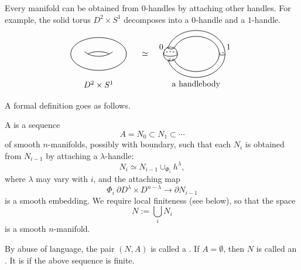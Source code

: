 Every manifold can be obtained from $0$-handles
by attaching other handles.
For example, the solid torus $D^2 \times S^1$
decomposes into a $0$-handle and a $1$-handle.
\[ \begin{tikzpicture}[line width=.6]
    \tikzstyle{dp}=[dash pattern=on 2pt off 2pt]
    \draw (0,0) ellipse (1.2 and .7);
    \draw (0,-.1) arc (-90 : -30 : .7 and .4);
    \draw (0,-.1) arc (-90 : -150 : .7 and .4);
    \draw (0,.1) arc (90 : 50 : .7 and .4);
    \draw (0,.1) arc (90 : 130 : .7 and .4);
    
    \node at (2,0) {\text{$\simeq$}};

    \draw[dp] (2.8,0) arc (180 : 50 : .3);
    \draw (2.8,0) arc (180 : 110 : .3);
    \draw (2.8,0) arc (180 : 420 : .3);
    \draw[dp] (2.8,0) arc (180 : 0 : .3 and .1);
    \draw (2.8,0) arc (180 : 360 : .3 and .1);

    \draw (5.45,0) arc (0 : 166 : 1.25 and 1);
    \draw (5.45,0) arc (0 : -165 : 1.25 and 1);
    \draw (5.2,0) arc (0 : 162 : 1 and .75);
    \draw (5.2,0) arc (0 : -161 : 1 and .75);

    \draw[dp] (3,.24) arc (180 : 0 : .12 and .03);
    \draw (3,.24) arc (180 : 360 : .12 and .03);
    \draw[dp] (3.12,-.24) ellipse (.12 and .03);
    \draw[dp] (5.2,0) arc (180 : 0 : .125 and .05);
    \draw (5.2,0) arc (180 : 360 : .125 and .05);

    \node at (0,-1.3) {\text{$D^2 \times S^1$}};
    \node at (4.2,-1.3) {\text{a handlebody}};
    \node at (2.7,.3) {\text{0}};
    \node at (5.6,.3) {\text{1}};
\end{tikzpicture} \]

A formal definition goes as follows.

\begin{definition}
    A  is a sequence
    \[ A = N_0 \subset N_1 \subset \cdots \]
    of smooth $n$-manifolds, possibly with boundary,
    such that each $N_i$ is obtained from $N_{i-1}$
    by attaching a $\lambda$-handle:
    \[ N_i \simeq N_{i-1} \cup_{\Phi_i} h^\lambda, \]
    where $\lambda$ may vary with $i$, and the attaching map
    \[ \Phi_i \: \partial D^\lambda \times D^{n-\lambda} \to \partial N_{i-1} \]
    is a smooth embedding.
    We require local finiteness (see below), so that the space
    \[ N := \bigcup_i N_i \]
    is a smooth $n$-manifold.

    By abuse of language,
    the pair $(N,A)$ is called a .
    If $A=\emptyset$, then $N$ is called an .
    It is  if the above sequence is finite. \varqed
\end{definition}

